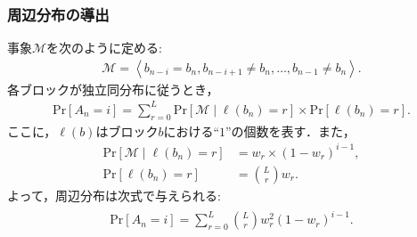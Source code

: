 \documentclass[dvipdfmx,11pt]{beamer}
\begin{document}
\begin{frame}[c]\frametitle{周辺分布の導出}
\vspace{.5\baselineskip}
事象$\mathcal{M}$を次のように定める:
\begin{align*}
  \mathcal{M} = \left< b_{n-i} = b_{n}, b_{n-i+1} \neq b_{n} ,\dots, b_{n-1} \neq b_{n}  \right>.
\end{align*}
各ブロックが独立同分布に従うとき，
\begin{align*}
  \mathrm{Pr}[A_n=i] = \sum_{r=0}^{L} \mathrm{Pr}[\mathcal{M} \mid \ell(b_n) = r] \times \mathrm{Pr} [\ell(b_n) = r].
\end{align*}
ここに，$\ell(b)$はブロック$b$における``$1$''の個数を表す．また，
%
\begin{align*}
  \mathrm{Pr}[\mathcal{M} \mid \ell(b_n) = r] &= w_r \times ( 1 - w_r )^{i-1},\\
  \mathrm{Pr} [\ell(b_n) = r] &= \binom{L}{r} w_r. 
\end{align*}
よって，周辺分布は次式で与えられる:
\begin{align*}\begin{split}
  \mathrm{Pr}[A_n=i] = \sum_{r=0}^{L} \binom{L}{r} w_r^2 (1-w_r)^{i-1}.
\end{split}\end{align*}
\end{frame}
\end{document}
